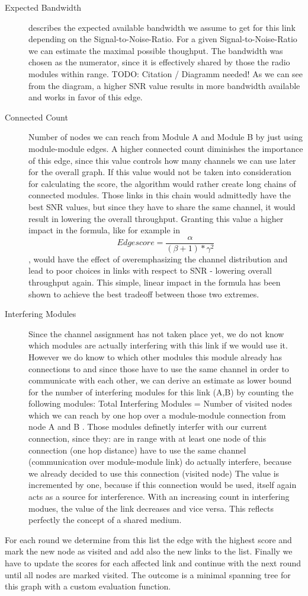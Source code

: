   \begin{description}
    \item[Expected Bandwidth]
    describes the expected available bandwidth we assume to get for this link depending on the Signal-to-Noise-Ratio.
    For a given Signal-to-Noise-Ratio we can estimate the maximal possible thoughput.
    The bandwidth was chosen as the numerator, since it is effectively shared by those the radio modules within range.
    TODO: Citation / Diagramm needed!
    As we can see from the diagram, a higher SNR value results in more bandwidth available and works in favor of this edge.
    \item[Connected Count]
    Number of nodes we can reach from Module A and Module B by just using module-module edges. 
    A higher connected count diminishes the importance of this edge, since this value controls how many channels we can use later for the overall graph.
    If this value would not be taken into consideration for calculating the score, the algorithm would rather create long chains of connected modules. 
    Those links in this chain would admittedly have the best SNR values, but since they have to share the same channel, it would result in lowering the overall throughput.
    Granting this value a higher impact in the formula, like for example in $$Edgescore=\frac{\alpha}{(\beta + 1 )* \gamma^2}$$, would have the effect of overemphasizing 
    the channel distribution and lead to poor choices in links with respect to SNR - lowering overall throughput again.
    This simple, linear impact in the formula has been shown to achieve the best tradeoff between those two extremes.
    \item[Interfering Modules]
    Since the channel assignment has not taken place yet, we do not know which modules are actually interfering with this link if we would use it.
    However we do know to which other modules this module already has connections to and since those have to use the same channel in order to communicate with each
    other, we can derive an estimate as lower bound for the number of interfering modules for this link (A,B) by counting the following modules:
    Total Interfering Modules = Number of visited nodes which we can reach by one hop over a module-module connection from node A and B
    . Those modules definetly interfer with our current connection, since they:
      are in range with at least one node of this connection (one hop distance)
      have to use the same channel (communication over module-module link)
      do actually interfere, because we already decided to use this connection (visited node)
    The value is incremented by one, because if this connection would be used, itself again acts as a source for interference.
    With an increasing count in interfering modues, the value of the link decreases and vice versa. This reflects perfectly the concept of a shared medium.
  \end{description}
  For each round we determine from this list the edge with the highest score and mark the new node as visited and add also the new links to the list.
  Finally we have to update the scores for each affected link and continue with the next round until all nodes are marked visited.
  The outcome is a minimal spanning tree for this graph with a custom evaluation function.
